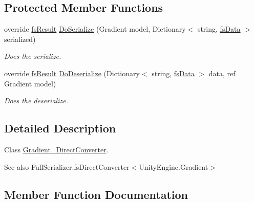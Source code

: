 \subsection*{Protected Member Functions}
\begin{DoxyCompactItemize}
\item 
override \hyperlink{struct_full_serializer_1_1fs_result}{fs\+Result} \hyperlink{class_full_serializer_1_1_internal_1_1_direct_converters_1_1_gradient___direct_converter_a9fdf07059a4318c6942e358749930ace}{Do\+Serialize} (Gradient model, Dictionary$<$ string, \hyperlink{class_full_serializer_1_1fs_data}{fs\+Data} $>$ serialized)
\begin{DoxyCompactList}\small\item\em Does the serialize. \end{DoxyCompactList}\item 
override \hyperlink{struct_full_serializer_1_1fs_result}{fs\+Result} \hyperlink{class_full_serializer_1_1_internal_1_1_direct_converters_1_1_gradient___direct_converter_a73df87f1f589a688bbf15bf41f8e6f25}{Do\+Deserialize} (Dictionary$<$ string, \hyperlink{class_full_serializer_1_1fs_data}{fs\+Data} $>$ data, ref Gradient model)
\begin{DoxyCompactList}\small\item\em Does the deserialize. \end{DoxyCompactList}\end{DoxyCompactItemize}


\subsection{Detailed Description}
Class \hyperlink{class_full_serializer_1_1_internal_1_1_direct_converters_1_1_gradient___direct_converter}{Gradient\+\_\+\+Direct\+Converter}. 

\begin{DoxySeeAlso}{See also}
Full\+Serializer.\+fs\+Direct\+Converter$<$\+Unity\+Engine.\+Gradient$>$


\end{DoxySeeAlso}


\subsection{Member Function Documentation}
\mbox{\label{class_full_serializer_1_1_internal_1_1_direct_converters_1_1_gradient___direct_converter_ab258e764b6b9ca08f1b0d38de248b7e1}} 
